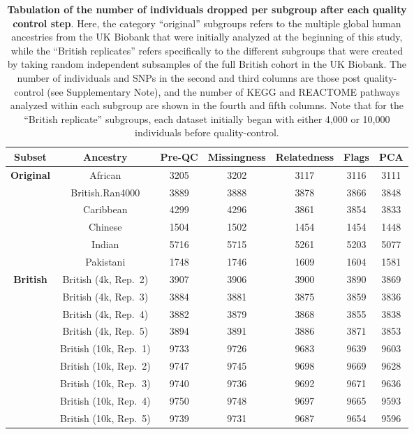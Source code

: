 \documentclass[10pt]{article}
\begin{document}
\begin{table}[ht]
\centering
\begin{tabular}{|c|c|c|c|c|c|c|}
  \hline
 \textbf{Subset} & \textbf{Ancestry} & \textbf{Pre-QC} & \textbf{Missingness} & \textbf{Relatedness} & \textbf{Flags} & \textbf{PCA} \\
  [2pt]\hline
\multirow{6.5}{*}{\textbf{Original}} & African & 3205 & 3202 & 3117 & 3116 & 3111 \\ [2pt]
  & British.Ran4000 & 3889 & 3888 & 3878 & 3866 & 3848 \\ [2pt]
  & Caribbean & 4299 & 4296 & 3861 & 3854 & 3833 \\ [2pt]
  & Chinese & 1504 & 1502 & 1454 & 1454 & 1448 \\ [2pt]
  & Indian & 5716 & 5715 & 5261 & 5203 & 5077 \\ [2pt]
  & Pakistani & 1748 & 1746 & 1609 & 1604 & 1581 \\ [2pt] \hline
  \multirow{9.5}{*}{\textbf{British}} & British (4k, Rep.~2) & 3907 & 3906 & 3900 & 3890 & 3869 \\ [2pt]
  & British (4k, Rep.~3) & 3884 & 3881 & 3875 & 3859 & 3836 \\ [2pt]
  & British (4k, Rep.~4) & 3882 & 3879 & 3868 & 3855 & 3838 \\ [2pt]
  & British (4k, Rep.~5) & 3894 & 3891 & 3886 & 3871 & 3853 \\ [2pt]
  & British (10k, Rep.~1) & 9733 & 9726 & 9683 & 9639 & 9603 \\ [2pt]
  & British (10k, Rep.~2) & 9747 & 9745 & 9698 & 9669 & 9628 \\ [2pt]
  & British (10k, Rep.~3) & 9740 & 9736 & 9692 & 9671 & 9636 \\ [2pt]
  & British (10k, Rep.~4) & 9750 & 9748 & 9697 & 9665 & 9593 \\ [2pt]
  & British (10k, Rep.~5) & 9739 & 9731 & 9687 & 9654 & 9596 \\ [2pt]
   \hline
\end{tabular}
\caption{\textbf{Tabulation of the number of individuals dropped per subgroup after each quality control step}. Here, the category ``original'' subgroups refers to the multiple global human ancestries from the UK Biobank that were initially analyzed at the beginning of this study, while the ``British replicates'' refers specifically to the different subgroups that were created by taking random independent subsamples of the full British cohort in the UK Biobank. 
The number of individuals and SNPs in the second and third columns are those post quality-control (see Supplementary Note), and the number of KEGG and REACTOME pathways analyzed within each subgroup are shown in the fourth and fifth columns. Note that for the ``British replicate'' subgroups, each dataset initially began with either 4,000 or 10,000 individuals before quality-control.}
\label{InterPath-Supp-Table-UKBQCStats}
\end{table}


\clearpage
\begingroup
{}

\endgroup
\end{document}
